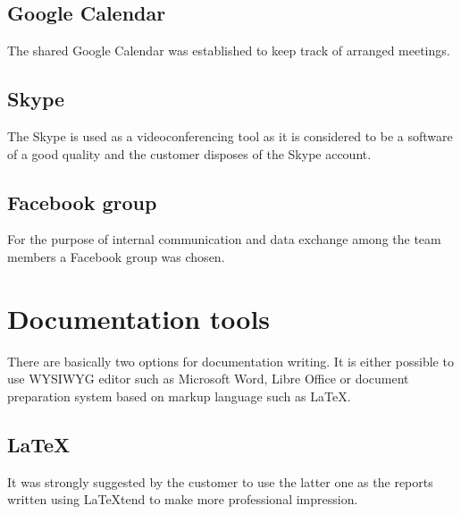 
\subsection{Google Calendar}
The shared Google Calendar was established to keep track of arranged meetings.


\subsection{Skype}
The Skype is used as a videoconferencing tool as it is considered to be a software of a good quality and the customer disposes of the Skype account.


\subsection{Facebook group}
For the purpose of internal communication and data exchange among the team members a Facebook group was chosen.


\section{Documentation tools} \label{txt:documentation tools}

There are basically two options for documentation writing. It is either possible to use WYSIWYG editor such as Microsoft Word, Libre Office or document preparation system based on markup language such as \LaTeX.

\subsection{LaTeX}

It was strongly suggested by the customer to use the latter one as the reports written using \LaTeX  tend to make more professional impression.


